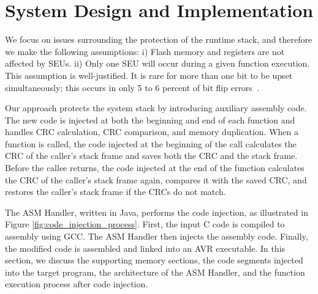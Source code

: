 \vspace{-15pt}
\section{System Design and Implementation}\label{sec:design}
\vspace{-5pt}

We focus on issues surrounding the protection of the runtime stack, and therefore we make the following assumptions: i) Flash memory and registers are not affected by SEUs. ii) Only one SEU will occur during a given function execution. This assumption is well-justified. It is rare for more than one bit to be upset simultaneously; this occurs in only 5 to 6 percent of bit flip errors~\cite{underwood1992sramorbit}.

Our approach protects the system stack by introducing auxiliary assembly code. The new code is injected at both the beginning and end of each function and handles CRC calculation, CRC comparison, and memory duplication. When a function is called, the code injected at the beginning of the call calculates the CRC of the caller's stack frame and saves both the CRC and the stack frame. Before the callee returns, the code injected at the end of the function calculates the CRC of the caller's stack frame again, compares it with the saved CRC, and restores the caller's stack frame if the CRCs do not match.

The ASM Handler, written in Java, performs the code injection, as illustrated in Figure \ref{fig:code_injection_process}. First, the input C code is compiled to assembly using GCC. The ASM Handler then injects the assembly code. Finally, the modified code is assembled and linked into an AVR executable. In this section, we discuss the supporting memory sections, the code segments injected into the target program, the architecture of the ASM Handler, and the function execution process after code injection.
\vspace{-10pt}
